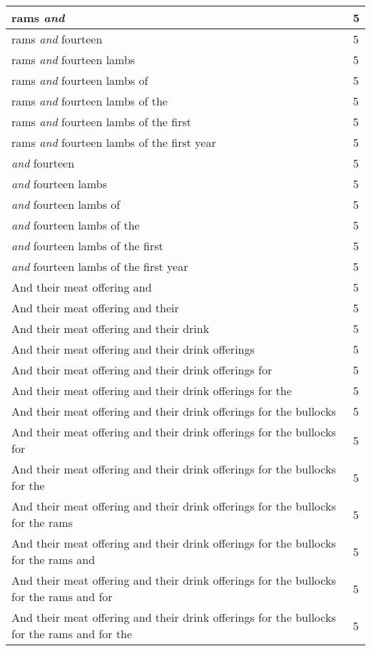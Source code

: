 \begin{center}
\begin{longtable}{|p{3.0in}|p{0.5in}|}
rams \emph{and} & 5\\ \hline 
rams \emph{and} fourteen & 5\\ \hline 
rams \emph{and} fourteen lambs & 5\\ \hline 
rams \emph{and} fourteen lambs of & 5\\ \hline 
rams \emph{and} fourteen lambs of the & 5\\ \hline 
rams \emph{and} fourteen lambs of the first & 5\\ \hline 
rams \emph{and} fourteen lambs of the first year & 5\\ \hline 
\emph{and} fourteen & 5\\ \hline 
\emph{and} fourteen lambs & 5\\ \hline 
\emph{and} fourteen lambs of & 5\\ \hline 
\emph{and} fourteen lambs of the & 5\\ \hline 
\emph{and} fourteen lambs of the first & 5\\ \hline 
\emph{and} fourteen lambs of the first year & 5\\ \hline 
And their meat offering and & 5\\ \hline 
And their meat offering and their & 5\\ \hline 
And their meat offering and their drink & 5\\ \hline 
And their meat offering and their drink offerings & 5\\ \hline 
And their meat offering and their drink offerings for & 5\\ \hline 
And their meat offering and their drink offerings for the & 5\\ \hline 
And their meat offering and their drink offerings for the bullocks & 5\\ \hline 
And their meat offering and their drink offerings for the bullocks for & 5\\ \hline 
And their meat offering and their drink offerings for the bullocks for the & 5\\ \hline 
And their meat offering and their drink offerings for the bullocks for the rams & 5\\ \hline 
And their meat offering and their drink offerings for the bullocks for the rams and & 5\\ \hline 
And their meat offering and their drink offerings for the bullocks for the rams and for & 5\\ \hline 
And their meat offering and their drink offerings for the bullocks for the rams and for the & 5\\ \hline 

\end{longtable}
\end{center}
